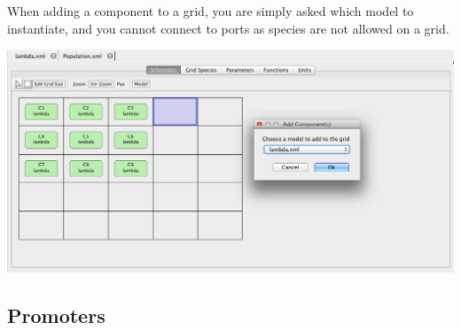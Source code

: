 \documentclass[titlepage,11pt]{article}
\begin{document}
When adding a component to a grid, you are simply asked which model to instantiate, and you cannot connect to ports as species are not allowed on a grid.

\begin{center}
\includegraphics[width=160mm]{screenshots/addCompGrid}
\end{center}

\clearpage

\subsection{\label{Promoters}Promoters}
\end{document}

